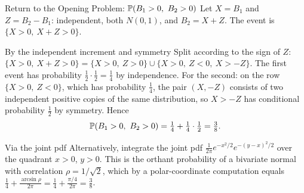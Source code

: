 \begin{frame}{Return to the Opening Problem: $\mathbb{P}(B_1>0,\ B_2>0)$}
  \label{fr:bmopen}
  \small
  Let $X=B_1$ and $Z=B_2-B_1$: independent, both $N(0,1)$, and $B_2=X+Z$. The event is $\{X>0,\ X+Z>0\}$.
  \begin{block}{By the independent increment and symmetry}
    Split according to the sign of $Z$: $\{X>0,\ X+Z>0\}=\{X>0,\ Z>0\}\cup\{X>0,\ Z<0,\ X>-Z\}$.
    The first event has probability $\tfrac12\cdot\tfrac12=\tfrac14$ by independence. For the second: on the row $\{X>0,\ Z<0\}$, which has probability $\tfrac14$, the pair $(X,-Z)$ consists of two independent positive copies of the same distribution, so $X>-Z$ has conditional probability $\tfrac12$ by symmetry. Hence
    \[
      \Prob(B_1>0,\ B_2>0)=\tfrac14+\tfrac14\cdot\tfrac12=\tfrac38 .
    \]
  \end{block}
  \begin{block}{Via the joint pdf}
    Alternatively, integrate the joint pdf $\frac1{2\pi}e^{-x^2/2}e^{-(y-x)^2/2}$ over the quadrant $x>0$, $y>0$. This is the orthant probability of a bivariate normal with correlation $\rho=1/\sqrt2$, which by a polar-coordinate computation equals $\tfrac14+\frac{\arcsin\rho}{2\pi}=\tfrac14+\tfrac{\pi/4}{2\pi}=\tfrac38$.
  \end{block}
\end{frame}


